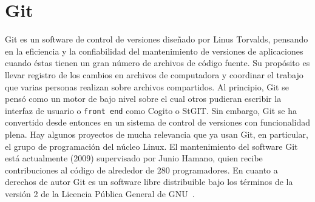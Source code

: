 \section{Git}
Git es un software de control de versiones diseñado por Linus Torvalds, pensando en la eficiencia y la confiabilidad del mantenimiento de versiones de aplicaciones cuando éstas tienen un gran número de archivos de código fuente. Su propósito es llevar registro de los cambios en archivos de computadora y coordinar el trabajo que varias personas realizan sobre archivos compartidos.
Al principio, Git se pensó como un motor de bajo nivel sobre el cual otros pudieran escribir la interfaz de usuario o \texttt{front end} como Cogito o StGIT.  Sin embargo, Git se ha convertido desde entonces en un sistema de control de versiones con funcionalidad plena.  Hay algunos proyectos de mucha relevancia que ya usan Git, en particular, el grupo de programación del núcleo Linux.
El mantenimiento del software Git está actualmente (2009) supervisado por Junio Hamano, quien recibe contribuciones al código de alrededor de 280 programadores. En cuanto a derechos de autor Git es un software libre distribuible bajo los términos de la versión 2 de la Licencia Pública General de GNU~\cite{wiki:git}.
